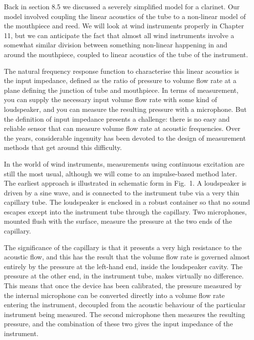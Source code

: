   Back in section 8.5 we discussed a severely simplified model for a clarinet. 
  Our model involved coupling the linear acoustics of the tube to a non-linear 
  model of the mouthpiece and reed. We will look at wind instruments properly 
  in Chapter 11, but we can anticipate the fact that almost all wind 
  instruments involve a somewhat similar division between something non-linear 
  happening in and around the mouthpiece, coupled to linear acoustics of the 
  tube of the instrument. 

  The natural frequency response function to characterise this linear acoustics 
  is the input impedance, defined as the ratio of pressure to volume flow rate 
  at a plane defining the junction of tube and mouthpiece. In terms of 
  measurement, you can supply the necessary input volume flow rate with some 
  kind of loudspeaker, and you can measure the resulting pressure with a 
  microphone. But the definition of input impedance presents a challenge: there 
  is no easy and reliable sensor that can measure volume flow rate at acoustic 
  frequencies. Over the years, considerable ingenuity has been devoted to the 
  design of measurement methods that get around this difficulty. 

  In the world of wind instruments, measurements using continuous excitation 
  are still the most usual, although we will come to an impulse-based method 
  later. The earliest approach is illustrated in schematic form in Fig.\ 1. A 
  loudspeaker is driven by a sine wave, and is connected to the instrument tube 
  via a very thin capillary tube. The loudspeaker is enclosed in a robust 
  container so that no sound escapes except into the instrument tube through 
  the capillary. Two microphones, mounted flush with the surface, measure the 
  pressure at the two ends of the capillary. 


  The significance of the capillary is that it presents a very high resistance 
  to the acoustic flow, and this has the result that the volume flow rate is 
  governed almost entirely by the pressure at the left-hand end, inside the 
  loudspeaker cavity. The pressure at the other end, in the instrument tube, 
  makes virtually no difference. This means that once the device has been 
  calibrated, the pressure measured by the internal microphone can be converted 
  directly into a volume flow rate entering the instrument, decoupled from the 
  acoustic behaviour of the particular instrument being measured. The second 
  microphone then measures the resulting pressure, and the combination of these 
  two gives the input impedance of the instrument. 

